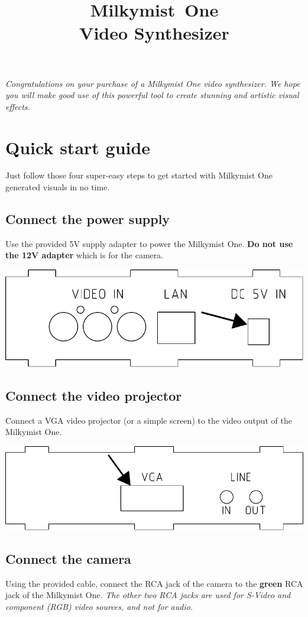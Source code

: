 \documentclass{leaflet}
\title{Milkymist\texttrademark~One\\Video Synthesizer}
\date{}
\begin{document}
\maketitle
\thispagestyle{empty}
\pagestyle{empty} 
\textit{Congratulations on your purchase of a Milkymist One video synthesizer. We hope you will make good use of this powerful tool to create stunning and artistic visual effects.}

\section{Quick start guide}
Just follow those four super-easy steps to get started with Milkymist One generated visuals in no time.

\subsection{Connect the power supply}
Use the provided 5V supply adapter to power the Milkymist One. \textbf{Do not use the 12V adapter} which is for the camera.

\includegraphics[width=\textwidth]{power.pdf}

\subsection{Connect the video projector}
Connect a VGA video projector (or a simple screen) to the video output of the Milkymist One.

\includegraphics[width=\textwidth]{vga.pdf}

\subsection{Connect the camera}
Using the provided cable, connect the RCA jack of the camera to the \textbf{green} RCA jack of the Milkymist One. \textit{The other two RCA jacks are used for S-Video and component (RGB) video sources, and not for audio.}
\end{document}
